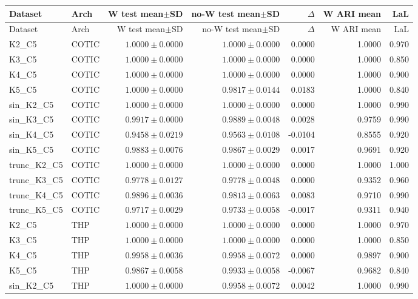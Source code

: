 \documentclass[11pt,a4paper]{article}
\begin{document}
\begin{landscape}
\scriptsize
\begin{longtable}{llrrrrr}
\toprule
Dataset & Arch & W test mean$\pm$SD & no-W test mean$\pm$SD & $\Delta$ & W ARI mean & LaL \\
\midrule
\endfirsthead
\toprule
Dataset & Arch & W test mean$\pm$SD & no-W test mean$\pm$SD & $\Delta$ & W ARI mean & LaL \\
\midrule
\endhead
K2\_C5 & COTIC & $1.0000\pm0.0000$ & $1.0000\pm0.0000$ & 0.0000 & 1.0000 & 0.970 \\
K3\_C5 & COTIC & $1.0000\pm0.0000$ & $1.0000\pm0.0000$ & 0.0000 & 1.0000 & 0.850 \\
K4\_C5 & COTIC & $1.0000\pm0.0000$ & $1.0000\pm0.0000$ & 0.0000 & 1.0000 & 0.900 \\
K5\_C5 & COTIC & $1.0000\pm0.0000$ & $0.9817\pm0.0144$ & 0.0183 & 1.0000 & 0.840 \\
sin\_K2\_C5 & COTIC & $1.0000\pm0.0000$ & $1.0000\pm0.0000$ & 0.0000 & 1.0000 & 0.990 \\
sin\_K3\_C5 & COTIC & $0.9917\pm0.0000$ & $0.9889\pm0.0048$ & 0.0028 & 0.9759 & 0.990 \\
sin\_K4\_C5 & COTIC & $0.9458\pm0.0219$ & $0.9563\pm0.0108$ & -0.0104 & 0.8555 & 0.920 \\
sin\_K5\_C5 & COTIC & $0.9883\pm0.0076$ & $0.9867\pm0.0029$ & 0.0017 & 0.9691 & 0.920 \\
trunc\_K2\_C5 & COTIC & $1.0000\pm0.0000$ & $1.0000\pm0.0000$ & 0.0000 & 1.0000 & 1.000 \\
trunc\_K3\_C5 & COTIC & $0.9778\pm0.0127$ & $0.9778\pm0.0048$ & 0.0000 & 0.9352 & 0.960 \\
trunc\_K4\_C5 & COTIC & $0.9896\pm0.0036$ & $0.9813\pm0.0063$ & 0.0083 & 0.9710 & 0.990 \\
trunc\_K5\_C5 & COTIC & $0.9717\pm0.0029$ & $0.9733\pm0.0058$ & -0.0017 & 0.9311 & 0.940 \\
\midrule
K2\_C5 & THP & $1.0000\pm0.0000$ & $1.0000\pm0.0000$ & 0.0000 & 1.0000 & 0.970 \\
K3\_C5 & THP & $1.0000\pm0.0000$ & $1.0000\pm0.0000$ & 0.0000 & 1.0000 & 0.850 \\
K4\_C5 & THP & $0.9958\pm0.0036$ & $0.9958\pm0.0072$ & 0.0000 & 0.9897 & 0.900 \\
K5\_C5 & THP & $0.9867\pm0.0058$ & $0.9933\pm0.0058$ & -0.0067 & 0.9682 & 0.840 \\
sin\_K2\_C5 & THP & $1.0000\pm0.0000$ & $0.9958\pm0.0072$ & 0.0042 & 1.0000 & 0.990 \\

\end{longtable}
\end{landscape}
\end{document}
